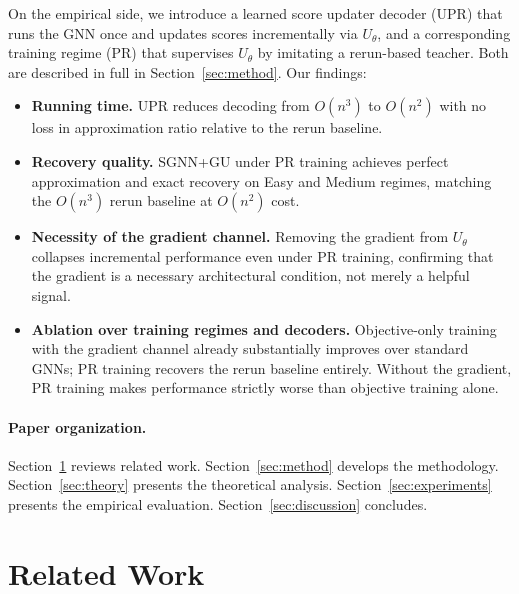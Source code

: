 \documentclass[11pt]{article}
\theoremstyle{plain}
\theoremstyle{remark}
\begin{document}
On the empirical side, we introduce a learned score updater decoder (UPR) that runs
the GNN once and updates scores incrementally via $U_\theta$, and a corresponding
training regime (PR) that supervises $U_\theta$ by imitating a rerun-based teacher.
Both are described in full in Section~\ref{sec:method}. Our findings:
\begin{itemize}
  \item \textbf{Running time.} UPR reduces decoding from $O(n^3)$ to $O(n^2)$
    with no loss in approximation ratio relative to the rerun baseline.
  \item \textbf{Recovery quality.} SGNN+GU under PR training achieves perfect
    approximation and exact recovery on Easy and Medium regimes, matching the
    $O(n^3)$ rerun baseline at $O(n^2)$ cost.
  \item \textbf{Necessity of the gradient channel.} Removing the gradient from
    $U_\theta$ collapses incremental performance even under PR training, confirming
    that the gradient is a necessary architectural condition, not merely a helpful
    signal.
  \item \textbf{Ablation over training regimes and decoders.} Objective-only
    training with the gradient channel already substantially improves over standard
    GNNs; PR training recovers the rerun baseline entirely. Without the gradient,
    PR training makes performance strictly worse than objective training alone.
\end{itemize}


\paragraph{Paper organization.}
Section~\ref{sec:related} reviews related work. Section~\ref{sec:method} develops
the methodology. Section~\ref{sec:theory} presents the theoretical analysis.
Section~\ref{sec:experiments} presents the empirical evaluation.
Section~\ref{sec:discussion} concludes.

\section{Related Work}
\label{sec:related}
\end{document}
